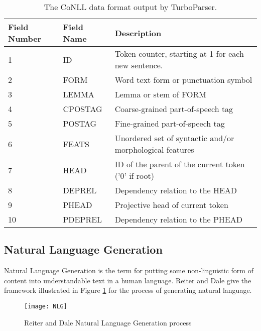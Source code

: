 \begin{table}
\centering
    \begin{tabular}{|l|l|l|}
    \hline
    Field Number & Field Name & Description                                                \\ \hline
    1            & ID         & Token counter, starting at 1 for each new sentence.        \\
    2            & FORM       & Word text form or punctuation symbol                       \\
    3            & LEMMA      & Lemma or stem of FORM                                      \\
    4            & CPOSTAG    & Coarse-grained part-of-speech tag                          \\
    5            & POSTAG     & Fine-grained part-of-speech tag                            \\
    6            & FEATS      & Unordered set of syntactic and/or morphological features   \\
    7            & HEAD       & ID of the parent of the current token ('0' if root)        \\
    8            & DEPREL     & Dependency relation to the HEAD                            \\
    9            & PHEAD      & Projective head of current token                           \\
    10           & PDEPREL    & Dependency relation to the PHEAD                           \\ \hline
    \end{tabular}
\caption{The CoNLL data format output by TurboParser.}
\label{tab:CoNLL}
\end{table}


\subsection{Natural Language Generation}
\label{sec:bg-nlg}
Natural Language Generation is the term for putting some non-linguistic form of content into understandable text in a human language. Reiter and Dale give the framework\cite{reiter2000building} illustrated in Figure \ref{fig:nlg} for the process of generating natural language.

\begin{figure}[h!]
\centering
\texttt{[image: NLG]}
\caption{Reiter and Dale Natural Language Generation process}
\label{fig:nlg}
\end{figure}

